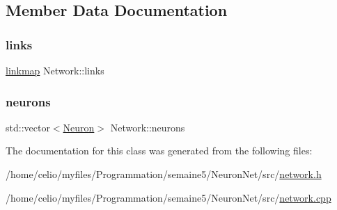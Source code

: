 \subsection{Member Data Documentation}
\mbox{\label{classNetwork_aef1609a9a6b865651417ce995b4575a8}} 
\subsubsection{\texorpdfstring{links}{links}}
{\footnotesize\ttfamily \hyperlink{network_8h_a889f48bcec09c9d72a03648e911c5ff5}{linkmap} Network\+::links\hspace{0.3cm}{\ttfamily [private]}}

\mbox{\label{classNetwork_a1b7832bc2c7b8855cdc3b2d6329eff9d}} 
\subsubsection{\texorpdfstring{neurons}{neurons}}
{\footnotesize\ttfamily std\+::vector$<$\hyperlink{classNeuron}{Neuron}$>$ Network\+::neurons\hspace{0.3cm}{\ttfamily [private]}}



The documentation for this class was generated from the following files\+:\begin{DoxyCompactItemize}
\item 
/home/celio/myfiles/\+Programmation/semaine5/\+Neuron\+Net/src/\hyperlink{network_8h}{network.\+h}\item 
/home/celio/myfiles/\+Programmation/semaine5/\+Neuron\+Net/src/\hyperlink{network_8cpp}{network.\+cpp}\end{DoxyCompactItemize}
